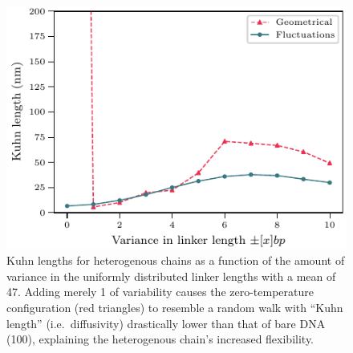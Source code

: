 \documentclass[%
 reprint,
superscriptaddress,
showpacs,preprintnumbers,
 amsmath,amssymb,
 aps,
 prl,
]{revtex4-1}
\begin{document}
\begin{figure}[t]
    \centering
    \includegraphics[width=0.95\linewidth]{./figures/fig4_kuhn_length_vs_window_size_mu47bp.pdf}
    \caption{Kuhn lengths for heterogenous chains as a function of
     the amount of variance in the uniformly distributed linker lengths with a mean
     of \SI{47}{\basepair}. Adding merely \SI{1}{\basepair} of variability causes the
     zero-temperature configuration (red triangles) to resemble a random walk with ``Kuhn
     length'' (i.e.\ diffusivity) drastically lower than that of bare DNA
     (\SI{100}{\basepair}), explaining the heterogenous chain's increased
    flexibility.}\label{fig:box-kuhns}
\end{figure}
\end{document}
